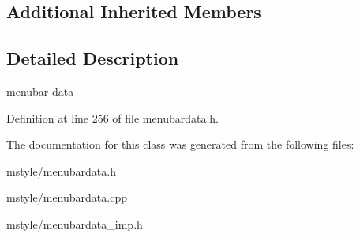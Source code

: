 \subsection*{Additional Inherited Members}


\subsection{Detailed Description}
menubar data 

Definition at line 256 of file menubardata.\+h.



The documentation for this class was generated from the following files\+:\begin{DoxyCompactItemize}
\item 
mstyle/menubardata.\+h\item 
mstyle/menubardata.\+cpp\item 
mstyle/menubardata\+\_\+imp.\+h\end{DoxyCompactItemize}
